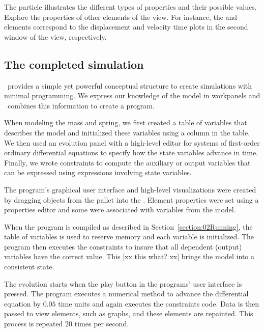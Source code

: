 
The particle illustrates the different types of properties and their possible values. Explore the properties of other elements of the view.  For instance, the  and  elements correspond to the displacement and velocity time plots in the second window of the view, respectively.

\subsection{The completed simulation}
\Ejs\ provides a simple yet powerful conceptual structure to create simulations with minimal programming. We express
our knowledge of the model in workpanels and \ejs\ combines this information to create a program.

When modeling the mass and spring, we first created a table of variables that describes the model and initialized these
variables using a column in the table. We then used an evolution panel with a high-level editor for systems of
first-order ordinary differential equations to specify how the state variables advance in time. Finally, we wrote
constraints to compute the auxiliary or output variables that can be expressed using expressions involving state variables.

The program's graphical user interface and high-level visualizations were created by dragging objects from the
 pallet into the . Element properties were set using a properties editor and some were associated with variables from the model.

When the program is compiled as described in Section~\ref{section:02Running}, the table of variables is used to reserve memory and each variable is initialized. The program then executes the constraints to insure that all dependent (output) variables have the correct value. This [xx this what? xx] brings the model into a consistent state.

The evolution starts when the play button in the programs' user interface is pressed. The program executes a numerical method to advance the differential equation by $0.05$ time units and again executes the constraints code.  Data is then passed to view elements, such as graphs, and these elements are repainted. This process is repeated $20$ times per second.

